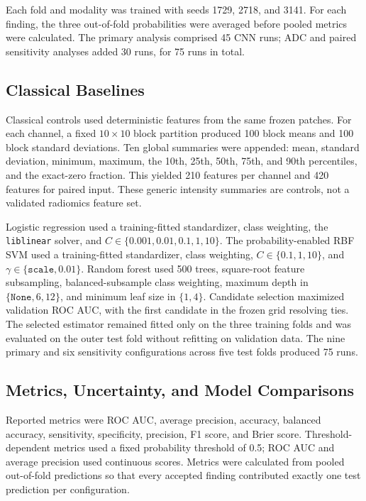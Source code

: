 \documentclass[11pt]{article}
\begin{document}
Each fold and modality was trained with seeds 1729, 2718, and 3141. For each finding, the three out-of-fold probabilities were averaged before pooled metrics were calculated. The primary analysis comprised 45 CNN runs; ADC and paired sensitivity analyses added 30 runs, for 75 runs in total.

\subsection{Classical Baselines}\label{sec:3.7}

Classical controls used deterministic features from the same frozen patches. For each channel, a fixed $10\times10$ block partition produced 100 block means and 100 block standard deviations. Ten global summaries were appended: mean, standard deviation, minimum, maximum, the 10th, 25th, 50th, 75th, and 90th percentiles, and the exact-zero fraction. This yielded 210 features per channel and 420 features for paired input. These generic intensity summaries are controls, not a validated radiomics feature set.

Logistic regression used a training-fitted standardizer, class weighting, the \texttt{liblinear} solver, and $C\in\{0.001,0.01,0.1,1,10\}$. The probability-enabled RBF SVM used a training-fitted standardizer, class weighting, $C\in\{0.1,1,10\}$, and $\gamma\in\{\texttt{scale},0.01\}$. Random forest used 500 trees, square-root feature subsampling, balanced-subsample class weighting, maximum depth in $\{\texttt{None},6,12\}$, and minimum leaf size in $\{1,4\}$. Candidate selection maximized validation ROC AUC, with the first candidate in the frozen grid resolving ties. The selected estimator remained fitted only on the three training folds and was evaluated on the outer test fold without refitting on validation data. The nine primary and six sensitivity configurations across five test folds produced 75 runs.

\subsection{Metrics, Uncertainty, and Model Comparisons}\label{sec:3.8}

Reported metrics were ROC AUC, average precision, accuracy, balanced accuracy, sensitivity, specificity, precision, F1 score, and Brier score. Threshold-dependent metrics used a fixed probability threshold of 0.5; ROC AUC and average precision used continuous scores. Metrics were calculated from pooled out-of-fold predictions so that every accepted finding contributed exactly one test prediction per configuration.
\end{document}

